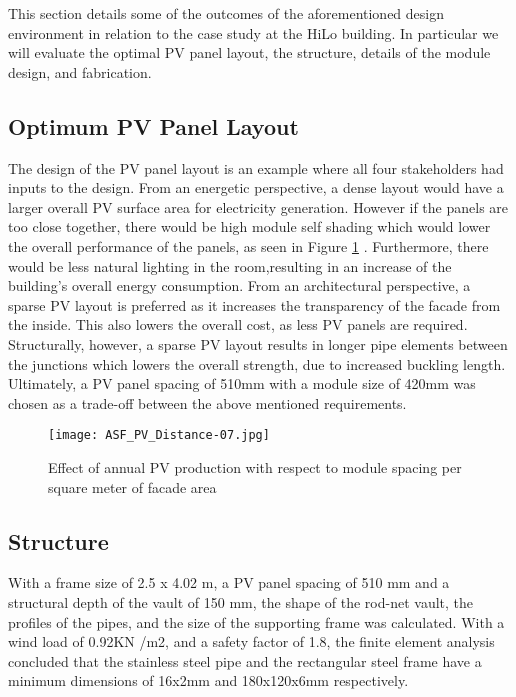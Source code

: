 

This section details some of the outcomes of the aforementioned design environment in relation to the case study at the HiLo building. In particular we will evaluate the optimal PV panel layout, the structure, details of the module design, and fabrication.

\subsection{Optimum PV Panel Layout}
The design of the PV panel layout is an example where all four stakeholders had inputs to the design. From an energetic perspective, a dense layout would have a larger overall PV surface area for electricity generation. However if the panels are too close together, there would be high module self shading which would lower the overall performance of the panels, as seen in Figure \ref{fig:spacing} \cite{hofer2016parametric}. Furthermore, there would be less natural lighting in the room,resulting in an increase of the building's overall  energy consumption. From an architectural perspective, a sparse PV layout is preferred as it increases the transparency of the facade from the inside. This also lowers the overall cost, as less PV panels are required. Structurally, however, a sparse PV layout results in longer pipe elements between the junctions which lowers the overall strength, due to increased buckling length. Ultimately, a PV panel spacing of 510mm with a module size of 420mm was chosen as a trade-off between the above mentioned requirements. 

\begin{figure}
\begin{center}
\texttt{[image: ASF\_PV\_Distance-07.jpg]}
\caption{Effect of annual PV production with respect to module spacing per square meter of facade area \cite{hofer2016parametric}}
\label{fig:spacing}
\end{center}
\end{figure}

\subsection{Structure}
\label{ch:structure}


With a frame size of 2.5 x 4.02 m, a PV panel spacing of 510 mm and a structural depth of the vault of 150 mm, the shape of the rod-net vault, the profiles  of the pipes, and the size of the supporting frame was calculated. With a wind load of 0.92KN /m2, and a safety factor of 1.8, the finite element analysis concluded that the stainless steel pipe and the rectangular steel frame have a minimum dimensions of 16x2mm and 180x120x6mm respectively. 

